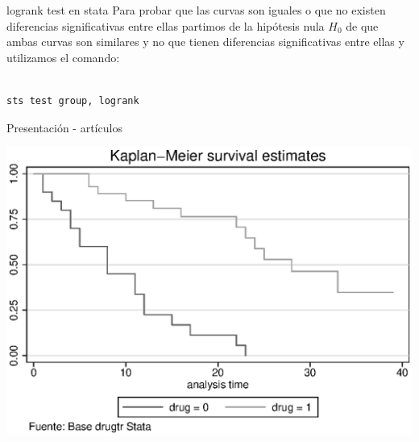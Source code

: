 \documentclass{beamer}
\begin{document}
\begin{frame}[fragile=singleslide]{logrank test en stata}
Para probar que las curvas son iguales o que no existen diferencias significativas entre ellas partimos de la hipótesis nula $H_0$ de que ambas curvas son similares y no que tienen diferencias significativas entre ellas y utilizamos el comando:

\begin{verbatim}

sts test group, logrank

\end{verbatim}

\end{frame}


\begin{frame}{Presentación - artículos}

\includegraphics[scale=0.78]{curva.eps}



\end{frame}
\end{document}
